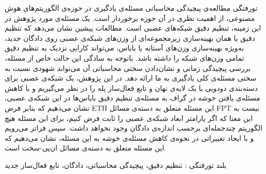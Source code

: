 


‌تورفتگی
مطالعه‌ی پیچیدگی محاسباتی مسئله‌ی یادگیری در حوزه‌‌ی الگوریتم‌های هوش مصنوعی، از اهمیت نظری در آن حوزه برخوردار است. یک مسئله‌ی مورد پژوهش در این زمینه، تنظیم دقیق شبکه‌های عصبی است. مطالعات پیشین نشان می‌دهد که تنظیم دقیق یا همان بهینه‌سازی زیرمجموعه‌ای از وزن‌های شبکه‌ی عصبی روی دادگان جدید، به‌ویژه بهینه‌سازی وزن‌های آستانه یا بایاس، می‌تواند کارایی نزدیک به تنظیم دقیق تمامی وزن‌های شبکه را داشته باشد. باتوجه به سادگی این حالت خاص از مسئله، بررسی پیچیدگی زمانی و نشان‌دادن سختی محاسباتی آن می‌تواند شهودی نسبت به سختی مسئله‌ی کلی یادگیری به ما ارائه دهد. در این پژوهش، یک شبکه‌ی عصبی برای دسته‌بندی دودویی با یک لایه‌ی نهان و تابع فعال‌ساز پله را در نظر می‌گیریم و با کاهش مسئله‌ی یافتن خوشه در گراف به مسئله‌ی تنظیم دقیق بایاس‌ها در این شبکه‌ی عصبی، نشان می‌دهیم که بنابر فرض ETH این مسئله متعلق به دسته‌ی مسائل FPT نیست به این معنا که اگر پارامتر ابعاد شبکه‌ی عصبی را ثابت فرض کنیم، برای این مسئله هیچ الگوریتم چندجمله‌ای برحسب اندازه‌ی دادگان وجود نخواهد داشت. سپس فراتر می‌رویم و با ایجاد تغییراتی در نحوه‌ی کاهش مسئله‌ی خوشه به این مسئله، نشان می‌دهیم که این مسئله متعلق به دسته‌ی مسائل ان‌پی-سخت است.

‌بلند
‌تورفتگی : 
تنظیم دقیق، پیچیدگی محاسباتی، دادگان، تابع فعال‌ساز
‌جدید
